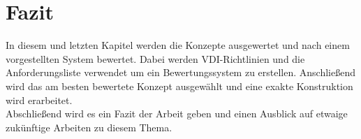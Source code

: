 \chapter{Fazit}\label{ch:conclusion}
In diesem und letzten Kapitel werden die Konzepte ausgewertet und nach einem vorgestellten System bewertet. Dabei werden VDI-Richtlinien und die Anforderungsliste verwendet um ein Bewertungssystem zu erstellen. Anschließend wird das am besten bewertete Konzept ausgewählt und eine exakte Konstruktion wird erarbeitet.\\
Abschließend wird es ein Fazit der Arbeit geben und einen Ausblick auf etwaige zukünftige Arbeiten zu diesem Thema.






